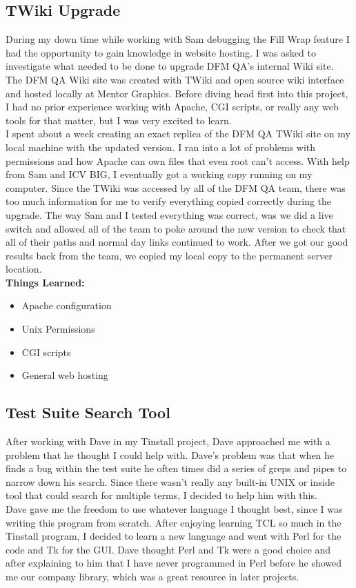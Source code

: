 \documentclass[letterpaper,10pt,notitlepage,fleqn]{article}
\begin{document}
\subsection{TWiki Upgrade}
\indent During my down time while working with Sam debugging the Fill Wrap feature I had 
the opportunity to gain knowledge in website hosting. I was asked to investigate 
what needed to be done to upgrade DFM QA's internal Wiki site. The DFM QA Wiki 
site was created with TWiki and open source wiki interface and hosted locally at Mentor 
Graphics. Before diving head first into this project, I had no prior experience working 
with Apache, CGI scripts, or really any web tools for that matter, but I was very 
excited to learn. \\
\indent I spent about a week creating an exact replica of the DFM QA TWiki site on my local 
machine with the updated version. I ran into a lot of problems with permissions 
and how Apache can own files that even root can't access. With help from Sam and 
ICV BIG, I eventually got a working copy running on my computer. Since the TWiki 
was accessed by all of the DFM QA team, there was too much information for me to 
verify everything copied correctly during the upgrade. The way Sam and I tested 
everything was correct, was we did a live switch and allowed all of the team to 
poke around the new version to check that all of their paths and normal day links 
continued to work. After we got our good results back from the team, we copied my 
local copy to the permanent server location. \\

\textbf{Things Learned:}
    \begin{itemize} 
        \item Apache configuration
        \item Unix Permissions
        \item CGI scripts
        \item General web hosting 
    \end{itemize}

\subsection{Test Suite Search Tool}
\indent After working with Dave in my Tinstall project, Dave approached me with a problem 
that he thought I could help with. Dave's problem was that when he finds a bug within 
the test suite he often times did a series of greps and pipes to narrow down his 
search. Since there wasn't really any built-in UNIX or inside tool that could search 
for multiple terms, I decided to help him with this. \\ 
\indent Dave gave me the freedom to use whatever language I thought best, since I was writing 
this program from scratch. After enjoying learning TCL so much in the Tinstall 
program, I decided to learn a new language and went with Perl for the code and Tk 
for the GUI. Dave thought Perl and Tk were a good choice and after explaining to 
him that I have never programmed in Perl before he showed me our company library, 
which was a great resource in later projects.
\end{document}
